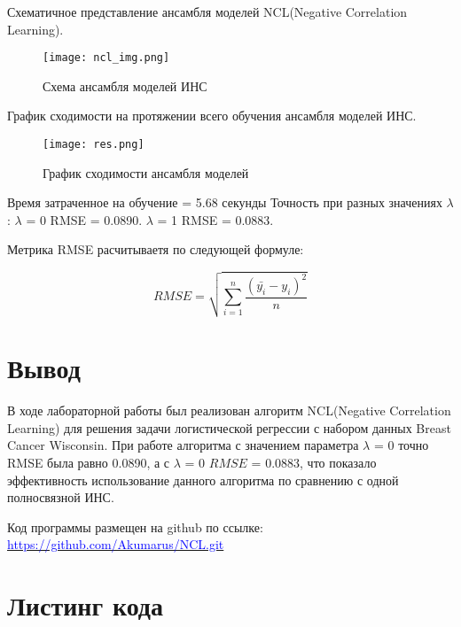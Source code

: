\documentclass[12pt]{extarticle}
\begin{document}
Схематичное представление ансамбля моделей NCL(Negative Correlation Learning).

\begin{figure}[H]
    \centering
    \texttt{[image: ncl\_img.png]} %
    \caption{Схема ансамбля моделей ИНС}
    \label{fig:example}
\end{figure}

\FloatBarrier %

График сходимости на протяжении всего обучения ансамбля моделей ИНС.

\begin{figure}[H]
    \centering
    \texttt{[image: res.png]} %
    \caption{График сходимости ансамбля моделей}
    \label{fig:example}
\end{figure}

\FloatBarrier %

Время затраченное на обучение = 5.68 секунды  Точность при разных значениях \(\lambda\):  \(\lambda\) = 0 RMSE = 0.0890. \(\lambda\) = 1 RMSE = 0.0883. 

Метрика RMSE расчитываетя по следующей формуле:

\begin{equation} \label{eq:formula4}
 RMSE = \sqrt{\sum_{i=1}^{n}\frac{(\bar{y_i} - y_i)^2}{n}}
\end{equation}

\section{Вывод}
В ходе лабораторной работы был реализован алгоритм NCL(Negative Correlation Learning) для решения задачи логистической регрессии с набором данных Breast Cancer Wisconsin. При работе алгоритма с значением параметра \(\lambda\) = 0 точно RMSE была равно 0.0890, а с \(\lambda\) = 0 \(RMSE\) = 0.0883, что показало эффективность использование данного алгоритма по сравнению с одной полносвязной ИНС.

Код программы размещен на github по ссылке: \href{https://github.com/Akumarus/NCL.git}{\textcolor{blue}{https://github.com/Akumarus/NCL.git}}

\newpage %

\section{Листинг кода}
\end{document}
